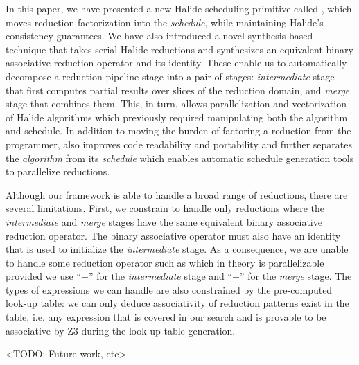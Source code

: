 In this paper, we have presented a new Halide scheduling primitive called , which moves reduction factorization into the \emph{schedule}, while maintaining Halide's consistency guarantees. We have also introduced a novel synthesis-based technique that takes serial Halide reductions and synthesizes an equivalent binary associative reduction operator and its identity. These enable us to automatically decompose a reduction pipeline stage into a pair of stages: \emph{intermediate} stage that first computes partial results over slices of the reduction domain, and \emph{merge} stage that combines them. This, in turn, allows parallelization and vectorization of Halide algorithms which previously required manipulating both the algorithm and schedule. In addition to moving the burden of factoring a reduction from the programmer,  also improves code readability and portability and further separates the \emph{algorithm} from its \emph{schedule} which enables automatic schedule generation tools to parallelize reductions. 

Although our framework is able to handle a broad range of reductions, there are several limitations. First, we constrain  to handle only reductions where the \emph{intermediate} and \emph{merge} stages have the same equivalent binary associative reduction operator. The binary associative operator must also have an identity that is used to initialize the \emph{intermediate} stage. As a consequence, we are unable to handle some reduction operator such as  which in theory is parallelizable provided we use ``$-$'' for the \emph{intermediate} stage and ``$+$'' for the \emph{merge} stage. The types of expressions we can handle are also constrained by the pre-computed look-up table: we can only deduce associativity of reduction patterns exist in the table, i.e. any expression that is covered in our search and is provable to be associative by Z3 during the look-up table generation. 

<TODO: Future work, etc>


